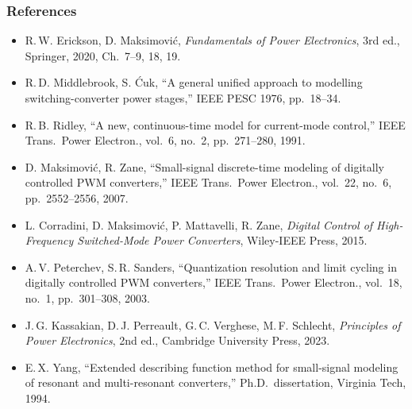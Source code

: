 \begin{frame}
	\frametitle{References}
	\scriptsize
	\begin{itemize}
		\item R.\,W. Erickson, D. Maksimovi\'c, \textit{Fundamentals of Power Electronics}, 3rd ed., Springer, 2020, Ch.\ 7--9, 18, 19.
		\item R.\,D. Middlebrook, S. \'Cuk, ``A general unified approach to modelling switching-converter power stages,'' IEEE PESC 1976, pp.\ 18--34.
		\item R.\,B. Ridley, ``A new, continuous-time model for current-mode control,'' IEEE Trans.\ Power Electron., vol.\ 6, no.\ 2, pp.\ 271--280, 1991.
		\item D. Maksimovi\'c, R. Zane, ``Small-signal discrete-time modeling of digitally controlled PWM converters,'' IEEE Trans.\ Power Electron., vol.\ 22, no.\ 6, pp.\ 2552--2556, 2007.
		\item L. Corradini, D. Maksimovi\'c, P. Mattavelli, R. Zane, \textit{Digital Control of High-Frequency Switched-Mode Power Converters}, Wiley-IEEE Press, 2015.
		\item A.\,V. Peterchev, S.\,R. Sanders, ``Quantization resolution and limit cycling in digitally controlled PWM converters,'' IEEE Trans.\ Power Electron., vol.\ 18, no.\ 1, pp.\ 301--308, 2003.
		\item J.\,G. Kassakian, D.\,J. Perreault, G.\,C. Verghese, M.\,F. Schlecht, \textit{Principles of Power Electronics}, 2nd ed., Cambridge University Press, 2023.
		\item E.\,X. Yang, ``Extended describing function method for small-signal modeling of resonant and multi-resonant converters,'' Ph.D.\ dissertation, Virginia Tech, 1994.
	\end{itemize}
\end{frame}
